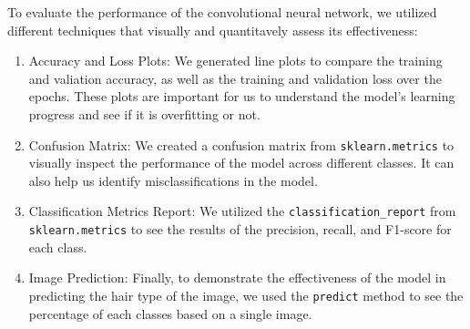 To evaluate the performance of the convolutional neural network, we utilized different techniques that visually and quantitavely assess its effectiveness:

\begin{enumerate}
  \item Accuracy and Loss Plots: We generated line plots to compare the training and valiation accuracy, as well as the training and validation loss over the epochs. These plots are important for us to understand the model's learning progress and see if it is overfitting or not.
  \item Confusion Matrix: We created a confusion matrix from \texttt{sklearn.metrics} to visually inspect the performance of the model across different classes. It can also help us identify misclassifications in the model.
  \item Classification Metrics Report: We utilized the \texttt{classification\_report} from \texttt{sklearn.metrics} to see the results of the precision, recall, and F1-score for each class. 
  \item Image Prediction: Finally, to demonstrate the effectiveness of the model in predicting the hair type of the image, we used the \texttt{predict} method to see the percentage of each classes based on a single image.
\end{enumerate}

